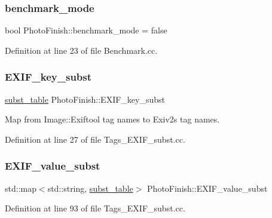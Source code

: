 \subsubsection{\texorpdfstring{benchmark\+\_\+mode}{benchmark\_mode}}
{\footnotesize\ttfamily bool Photo\+Finish\+::benchmark\+\_\+mode = false}



Definition at line 23 of file Benchmark.\+cc.

\mbox{\label{namespace_photo_finish_acca01aac5edaf04fa23bc5a9d77d8dfb}} 
\subsubsection{\texorpdfstring{E\+X\+I\+F\+\_\+key\+\_\+subst}{EXIF\_key\_subst}}
{\footnotesize\ttfamily \hyperlink{namespace_photo_finish_a99d3cfc086c8264e778255f5ef2b8b19}{subst\+\_\+table} Photo\+Finish\+::\+E\+X\+I\+F\+\_\+key\+\_\+subst}



Map from Image\+::\+Exiftool tag names to Exiv2\textquotesingle{}s tag names. 



Definition at line 27 of file Tags\+\_\+\+E\+X\+I\+F\+\_\+subst.\+cc.

\mbox{\label{namespace_photo_finish_a1f0c5f70be05938487cfe6ece463e22a}} 
\subsubsection{\texorpdfstring{E\+X\+I\+F\+\_\+value\+\_\+subst}{EXIF\_value\_subst}}
{\footnotesize\ttfamily std\+::map$<$std\+::string, \hyperlink{namespace_photo_finish_a99d3cfc086c8264e778255f5ef2b8b19}{subst\+\_\+table}$>$ Photo\+Finish\+::\+E\+X\+I\+F\+\_\+value\+\_\+subst}



Definition at line 93 of file Tags\+\_\+\+E\+X\+I\+F\+\_\+subst.\+cc.

\mbox{\label{namespace_photo_finish_ac96a97b2dc0860744b9f767795c3a418}} 
